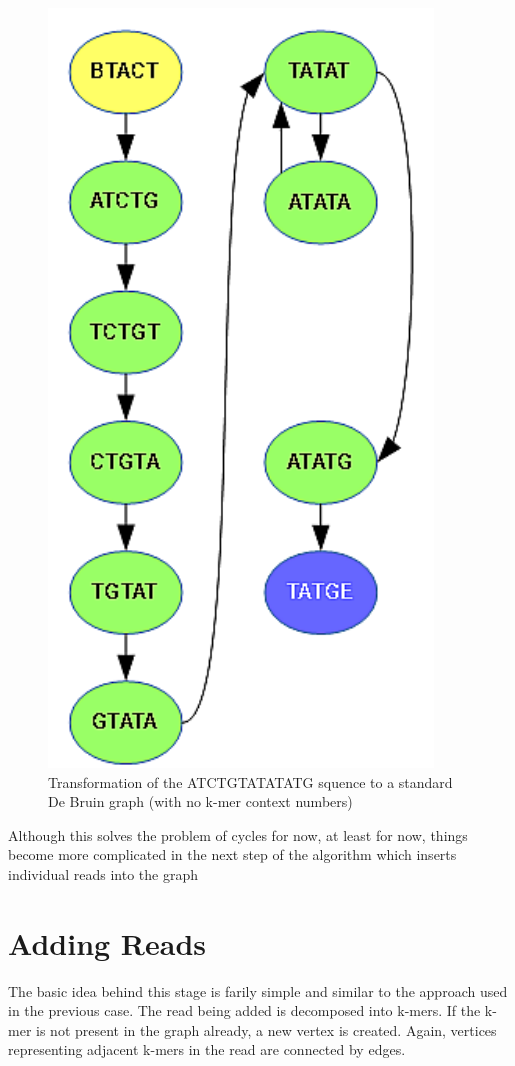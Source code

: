 \begin{figure}[h]
	\centering
	\includegraphics{img/ref-db.pdf}
	\caption{Transformation of the ATCTGTATATATG squence to a standard De Bruin graph (with no k-mer context numbers)}
	\label{fig:ref-db}
\end{figure}

Although this solves the problem of cycles for now, at least for now, things become more complicated in the next step of the algorithm which inserts individual reads into the graph

\section{Adding Reads}
\label{sec:adding-reads}

The basic idea behind this stage is farily simple and similar to the approach used in the previous case. The read being added is decomposed into k-mers. If the k-mer is not present in the graph already, a new vertex is created. Again, vertices representing adjacent k-mers in the read are connected by edges. 


